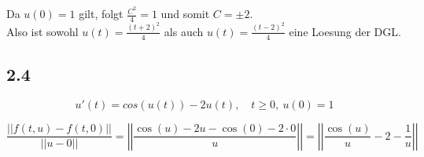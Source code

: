 \documentclass[10pt,oneside,a4paper]{scrartcl}
\begin{document}
		Da $u(0) = 1$ gilt, folgt $\frac{C^2}{4} = 1$ und somit $C=\pm 2$.\\
		Also ist sowohl $u(t) = \frac{(t+2)^2}{4}$ als auch  $u(t) = \frac{(t-2)^2}{4}$ eine Loesung der DGL.


 		\subsection*{2.4}

		\begin{equation*}
			u'(t) = cos(u(t)) - 2u(t),\quad t \geq 0, \ u(0) = 1
		\end{equation*}

		\begin{equation*}
			 \frac{||f(t,u) - f(t,0)||}{ ||u - 0|| } = \left | \left | \frac{\cos(u) - 2u - \cos(0) - 2 \cdot 0}{u} \right| \right| =  \left | \left | \frac{\cos(u)}{u} - 2 - \frac{1}{u} \right| \right|
		\end{equation*}
\end{document}
